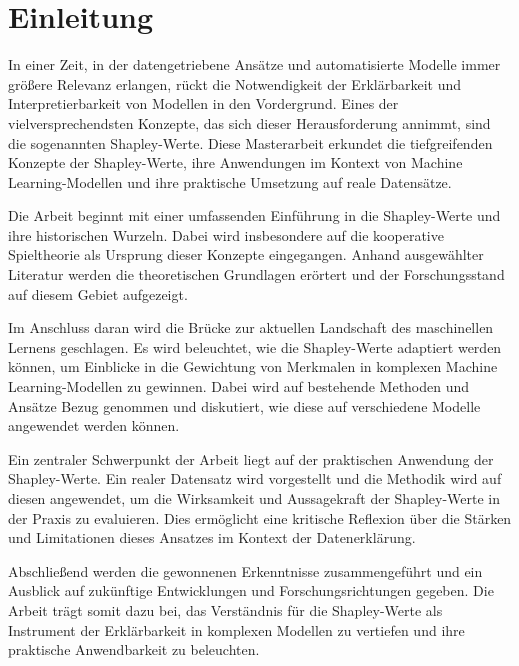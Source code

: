 \chapter{Einleitung}

In einer Zeit, in der datengetriebene Ansätze und automatisierte Modelle immer größere Relevanz erlangen, 
rückt die Notwendigkeit der Erklärbarkeit und Interpretierbarkeit von Modellen in den Vordergrund. 
Eines der vielversprechendsten Konzepte, das sich dieser Herausforderung annimmt, sind die sogenannten Shapley-Werte. 
Diese Masterarbeit erkundet die tiefgreifenden Konzepte der Shapley-Werte, ihre Anwendungen im Kontext von Machine Learning-Modellen 
und ihre praktische Umsetzung auf reale Datensätze.

Die Arbeit beginnt mit einer umfassenden Einführung in die Shapley-Werte und ihre historischen Wurzeln. 
Dabei wird insbesondere auf die kooperative Spieltheorie als Ursprung dieser Konzepte eingegangen. 
Anhand ausgewählter Literatur werden die theoretischen Grundlagen erörtert und der Forschungsstand auf diesem Gebiet aufgezeigt.

Im Anschluss daran wird die Brücke zur aktuellen Landschaft des maschinellen Lernens geschlagen. 
Es wird beleuchtet, wie die Shapley-Werte adaptiert werden können, um Einblicke in die Gewichtung von Merkmalen in komplexen 
Machine Learning-Modellen zu gewinnen. Dabei wird auf bestehende Methoden und Ansätze Bezug genommen und diskutiert, 
wie diese auf verschiedene Modelle angewendet werden können.

Ein zentraler Schwerpunkt der Arbeit liegt auf der praktischen Anwendung der Shapley-Werte. Ein realer Datensatz wird 
vorgestellt und die Methodik wird auf diesen angewendet, um die Wirksamkeit und Aussagekraft der Shapley-Werte in der 
Praxis zu evaluieren. Dies ermöglicht eine kritische Reflexion über die Stärken und Limitationen dieses Ansatzes im Kontext der Datenerklärung.

Abschließend werden die gewonnenen Erkenntnisse zusammengeführt und ein Ausblick auf zukünftige Entwicklungen und 
Forschungsrichtungen gegeben. Die Arbeit trägt somit dazu bei, das Verständnis für die Shapley-Werte als Instrument 
der Erklärbarkeit in komplexen Modellen zu vertiefen und ihre praktische Anwendbarkeit zu beleuchten.
